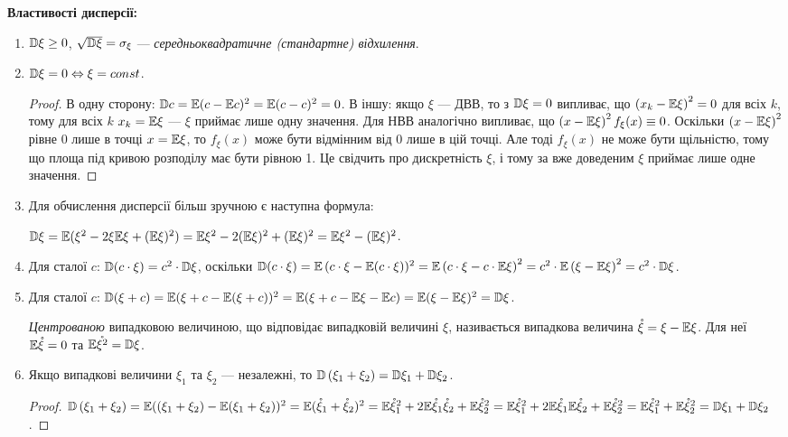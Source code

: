 \noindent \textbf{Властивості дисперсії:}
\begin{enumerate}
    \item $\mathbb{D}\xi \geq 0$, $\sqrt{\mathbb{D}\xi} = \sigma_\xi$ --- \emph{середньоквадратичне (стандартне) відхилення}.
    \item $\mathbb{D}\xi = 0 \Leftrightarrow \xi = const$.
    \begin{proof}
        В одну сторону: $\mathbb{D} c = \mathbb{E}(c - \mathbb{E} c)^2 = \mathbb{E}(c - c)^2 = 0$. В іншу: якщо $\xi$ --- ДВВ,
        то з $\mathbb{D}\xi = 0$ випливає, що $\left(x_k-\mathbb{E}\xi\right)^2 = 0$ для всіх $k$,
        тому для всіх $k$ $x_k = \mathbb{E} \xi$ --- $\xi$ приймає лише одну значення.
        Для НВВ аналогічно випливає, що $\left(x-\mathbb{E}\xi\right)^2 f_\xi(x) \equiv 0$. Оскільки $\left(x-\mathbb{E}\xi\right)^2$
        рівне $0$ лише в точці $x=\mathbb{E}\xi$, то $f_\xi(x)$ може бути відмінним від 0 лише в цій точці. Але тоді $f_\xi(x)$ не може бути щільністю,
        тому що площа під кривою розподілу має бути рівною 1. Це свідчить про дискретність $\xi$,
        і тому за вже доведеним $\xi$ приймає лише одне значення.
    \end{proof}
    \item Для обчислення дисперсії більш зручною є наступна формула:

    $\mathbb{D}\xi = \mathbb{E}(\xi^2 - 2\xi \mathbb{E}\xi +(\mathbb{E}\xi)^2) = \mathbb{E}\xi^2 - 2(\mathbb{E}\xi)^2 + (\mathbb{E}\xi)^2 = \mathbb{E}\xi^2 - (\mathbb{E}\xi)^2$. 
    \item Для сталої $c$: $\mathbb{D}(c\cdot \xi) = c^2\cdot \mathbb{D}\xi$, оскільки $\mathbb{D}(c\cdot \xi) = \mathbb{E}\left(c\cdot\xi-\mathbb{E}(c\cdot\xi\right))^2 = \mathbb{E}\left(c\cdot\xi - c\cdot \mathbb{E}\xi\right)^2 = c^2 \cdot \mathbb{E}\left(\xi-\mathbb{E}\xi\right)^2 = c^2 \cdot \mathbb{D}\xi$.
    \item Для сталої $c$: $\mathbb{D}(\xi + c) = \mathbb{E}(\xi + c - \mathbb{E}(\xi + c))^2 = \mathbb{E}(\xi + c - \mathbb{E}\xi - \mathbb{E} c) = \mathbb{E}(\xi - \mathbb{E}\xi)^2 = \mathbb{D}\xi$.
\begin{definition}
    \emph{Центрованою} випадковою величиною, що відповідає випадковій величині $\xi$, називається 
    випадкова величина $\mathring{\xi} = \xi - \mathbb{E}\xi$. Для неї $\mathbb{E}\mathring{\xi} = 0$ та 
    $\mathbb{E}\mathring{\xi^2} = \mathbb{D}\xi$.
\end{definition}
    \item Якщо випадкові величини $\xi_1$ та $\xi_2$ --- незалежні, то
    $\mathbb{D}\left(\xi_1 + \xi_2\right) = \mathbb{D}\xi_1 + \mathbb{D}\xi_2$.
    \begin{proof}
        $\mathbb{D}\left(\xi_1 + \xi_2\right) = \mathbb{E}((\xi_1 + \xi_2) - \mathbb{E}(\xi_1 + \xi_2))^2 = \mathbb{E}(\mathring{\xi}_1 + \mathring{\xi}_2)^2 =
        \mathbb{E}\mathring{\xi}_1^2 + 2\mathbb{E}\mathring{\xi}_1\mathring{\xi}_2 + \mathbb{E}\mathring{\xi}_2^2 = 
        \mathbb{E}\mathring{\xi}_1^2 + 2\mathbb{E}\mathring{\xi}_1 \mathbb{E}\mathring{\xi}_2 + \mathbb{E}\mathring{\xi}_2^2 =
        \mathbb{E}\mathring{\xi}_1^2 + \mathbb{E}\mathring{\xi}_2^2 = \mathbb{D}\xi_1 + \mathbb{D}\xi_2$.
    \end{proof}
\end{enumerate}

